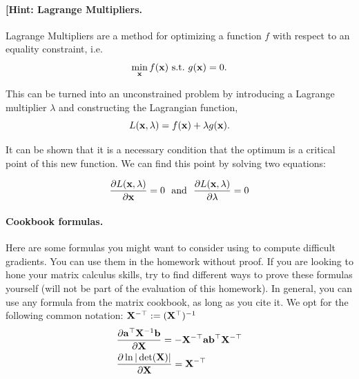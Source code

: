 \documentclass[submit]{harvardml}
\begin{document}
\begin{problem}
\paragraph{[Hint: Lagrange Multipliers.} Lagrange Multipliers are a method for
optimizing a function $f$ with respect to an
equality constraint, i.e.
\[\min_{\mathbf{x}} f(\mathbf{x})\ \text{s.t.}\ g(\mathbf{x}) = 0.\]

This can be turned into an unconstrained problem by introducing a
Lagrange multiplier $\lambda$ and constructing the Lagrangian function,
\[L(\mathbf{x}, \lambda) =  f(\mathbf{x}) + \lambda g(\mathbf{x}).\]

It can be shown that it is a necessary condition that the optimum
is a critical point of this new function. We can find this point by solving two equations:

\[\frac{\partial L(\mathbf{x}, \lambda)}{\partial  \mathbf{x}} = 0  \ \ \text{and}\  \  \frac{\partial L(\mathbf{x}, \lambda)}{\partial \lambda} = 0 \]


\paragraph{Cookbook formulas.} Here are some formulas you might want to consider
using to compute difficult gradients. You can use them  in the homework
without proof. If you are looking to hone your matrix calculus skills, try to
find different ways to prove these formulas yourself (will not be part of the
evaluation of this homework). In general, you can use any formula from the matrix cookbook,
as long as you cite it. We opt for the following common notation:
$\mathbf{X}^{-\top} := (\mathbf{X}^{\top})^{-1}$
\begin{align*}
  & \frac{\partial \mathbf{a}^\top \mathbf{X}^{-1} \mathbf{b}}{\partial \mathbf{X}} = - \mathbf{X}^{-\top} \mathbf{a} \mathbf{b}^\top \mathbf{X}^{-\top} \\
  & \frac{\partial \ln | \det (\mathbf{X}) |}{\partial \mathbf{X}} = \mathbf{X}^{-\top}
 \end{align*}
 \end{problem}
\end{document}
